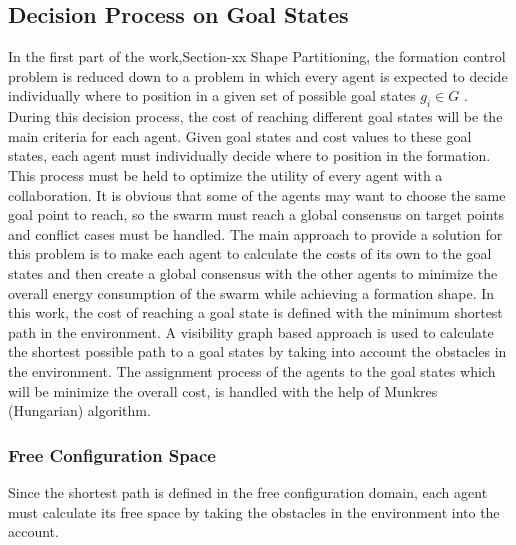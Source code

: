 \documentclass[twoside]{article}
\begin{document}
		\subsection{Decision Process on Goal States}
	In the first part of the work,Section-xx Shape Partitioning, the formation control problem is reduced down to a problem in which every agent is expected to decide individually where to position in a given set of possible goal states $g_i \in G$ .  During this decision process, the cost of reaching different goal states will be the main criteria for each agent. Given goal states and cost values to these goal states, each agent must individually  decide where to position in the formation. This process must be held to optimize the utility of every agent with a collaboration. It is obvious that some of the agents may want to choose the same goal point to reach, so the swarm must reach a global consensus on target points and conflict cases must be handled. The main approach to provide a solution for this problem is to make each agent to calculate the costs of its own to the goal states and then create a global consensus with the other agents to minimize the overall energy consumption of the swarm while achieving a formation shape. 
	In this work, the cost of reaching a goal state is defined with the minimum shortest path in the environment. A visibility graph based approach is used to calculate the shortest possible path to a goal states by taking into account the obstacles in the environment. The assignment process of the agents to the goal states which will be minimize the overall cost, is handled with the help of Munkres (Hungarian)  algorithm.
	
	\subsubsection{Free Configuration Space}
		Since the shortest path is defined in the free configuration domain, each agent must calculate its free space by taking the obstacles in the environment into the account. 
\end{document}
